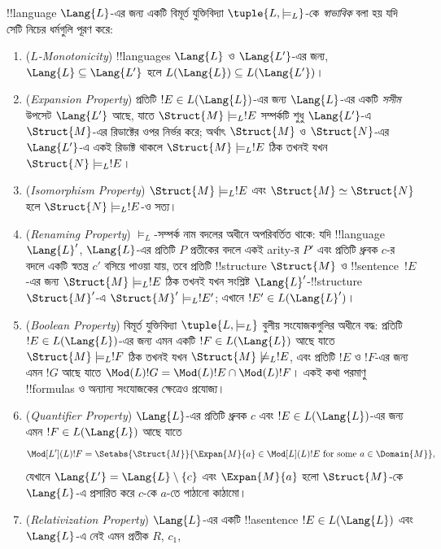 \documentclass[../../../include/open-logic-section]{subfiles}
\begin{document}
\begin{defn}
!!{language} $\Lang{L}$-এর জন্য একটি বিমূর্ত যুক্তিবিদ্যা
$\tuple{L,\models_L}$-কে \emph{স্বাভাবিক} বলা হয় যদি সেটি নিচের
ধর্মগুলি পূরণ করে:
\begin{enumerate}
\item (\emph{$L$-Monotonicity}) !!{language}s $\Lang{L}$ ও
  $\Lang{L'}$-এর জন্য, $\Lang{L} \subseteq \Lang{L'}$ হলে
  $L(\Lang{L}) \subseteq L(\Lang{L'})$।
\item (\emph{Expansion Property}) প্রতিটি $!E \in L(\Lang{L})$-এর
  জন্য $\Lang{L}$-এর একটি \emph{সসীম} উপসেট $\Lang{L'}$ আছে, যাতে
  $\Struct{M} \models_L !E$ সম্পর্কটি শুধু $\Lang{L'}$-এ
  $\Struct{M}$-এর রিডাক্টের ওপর নির্ভর করে; অর্থাৎ $\Struct{M}$ ও
  $\Struct{N}$-এর $\Lang{L'}$-এ একই রিডাক্ট থাকলে
  $\Struct{M} \models_L !E$ ঠিক তখনই যখন
  $\Struct{N} \models_L !E$।
\item (\emph{Isomorphism Property}) $\Struct{M} \models_L !E$
  এবং $\Struct{M} \simeq \Struct{N}$ হলে $\Struct{N} \models_L
  !E$-ও সত্য।
\item (\emph{Renaming Property}) $\models_L$-সম্পর্ক নাম বদলের
  অধীনে অপরিবর্তিত থাকে: যদি !!{language} $\Lang{L}'$, $\Lang{L}$-এর
  প্রতিটি $P$ প্রতীকের বদলে একই arity-র $P'$ এবং প্রতিটি ধ্রুবক $c$-র
  বদলে একটি স্বতন্ত্র $c'$ বসিয়ে পাওয়া যায়, তবে প্রতিটি !!{structure}
  $\Struct{M}$ ও !!{sentence}~$!E$-এর জন্য
  $\Struct{M} \models_L !E$ ঠিক তখনই যখন সংশ্লিষ্ট
  $\Lang{L}'$-!!{structure}~$\Struct{M}'$-এ
  $\Struct{M}' \models_L !E'$; এখানে $!E' \in L(\Lang{L}')$।
\item (\emph{Boolean Property}) বিমূর্ত যুক্তিবিদ্যা
  $\tuple{L,\models_L}$ বুলীয় সংযোজকগুলির অধীনে বদ্ধ: প্রতিটি
  $!E \in L(\Lang{L})$-এর জন্য এমন একটি $!F \in L(\Lang{L})$ আছে
  যাতে $\Struct{M} \models_L !F$ ঠিক তখনই যখন
  $\Struct{M} \not\models_L !E$, এবং প্রতিটি $!E$ ও $!F$-এর জন্য
  এমন $!G$ আছে যাতে $\Mod(L){!G} = \Mod(L){!E} \cap
  \Mod(L){!F}$। একই কথা পরমাণু !!{formula}s ও অন্যান্য সংযোজকের
  ক্ষেত্রেও প্রযোজ্য।
\item (\emph{Quantifier Property}) $\Lang{L}$-এর প্রতিটি ধ্রুবক $c$
  এবং $!E \in L(\Lang{L})$-এর জন্য এমন $!F \in L(\Lang{L})$ আছে যাতে
  \[
  \Mod[L'](L){!F} = \Setabs{\Struct{M}}{\Expan{M}{a} \in
  \Mod[L](L){!E} \text{ for some } a \in \Domain{M}},
  \]
  যেখানে $\Lang{L'} = \Lang{L} \setminus \{c\}$ এবং
  $\Expan{M}{a}$ হলো $\Struct{M}$-কে $\Lang{L}$-এ প্রসারিত করে $c$-কে
  $a$-তে পাঠানো কাঠামো।
\item (\emph{Relativization Property}) $\Lang{L}$-এর একটি !!a{sentence}
  $!E \in L(\Lang{L})$ এবং $\Lang{L}$-এ নেই এমন প্রতীক $R$, $c_1$,

\end{enumerate}
\end{defn}
\end{document}
